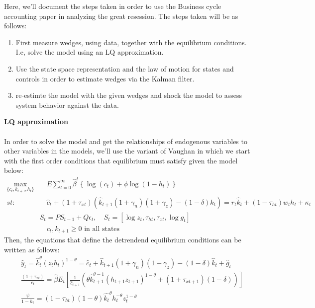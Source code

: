 \documentclass{article} %
\begin{document}
%
Here, we'll document the steps taken in order to use the Business cycle accounting paper in analyzing the great resession. The steps taken will be as follows:
\begin{enumerate}
\item First measure wedges, using data, together with the equilibrium conditions. I.e, solve the model using an LQ approximation.
\item Use the state space representation and the law of motion for states and controls in order to estimate wedges via the Kalman filter.
  \item re-estimte the model with the given wedges and shock the model to assess system behavior against the data. 
\end{enumerate}
\textbf{LQ approximation}
\\
\\
In order to solve the model and get the relationships of endogenous
variables to other variables in the models, we'll use the variant of
Vaughan in which we start with the first order conditions that
equilibrium must satisfy given the model below:
\begin{align*}
  \max_{\{c_t, k_{t+1}, h_t\}} & \quad  E\sum_{t=0}^{\infty} \hat{\beta}^t \left\{ \log(c_t) + \phi \log(1-h_t)     \right\}    \\
  st:     & \quad \hat{c}_t +  (1+\tau_{xt})(\hat{k}_{t+1}(1+\gamma_n)(1+\gamma_z) - (1-\delta)k_t) =r_t \hat{k}_t + (1-\tau_{ht}) w_t h_t + \kappa_t   \\
          & S_t = P S_{t-1} + Q \epsilon_t, \quad S_t = [\log z_t, \tau_{ht}, \tau_{xt}, \log g_t] \\
          & \quad c_t , k_{t+1} \geq 0 \text{ in all states}
\end{align*}
Then, the equations that define the detrendend equilibrium conditions can be written as
follows:
\begin{align} 
&\hat{y}_t = \hat{k}^{\theta}_t(z_t h_t)^{1-\theta} = \hat{c}_t + \hat{k}_{t+1}(1+\gamma_n)(1 + \gamma_z) - (1-\delta)\hat{k}_t + \hat{g}_t \label{eq:resource} \\
&\frac{(1+\tau_{xt})}{c_t} = \hat{\beta}E_t\left[\frac{1}{\hat{c}_{t+1}} \left(\theta \hat{k}_{t+1}^{\theta-1}(h_{t+1}z_{t+1})^{1-\theta} + (1+\tau_{xt+1})(1-\delta) \right) \right] \label{eq:euler} \\
& \frac{\psi}{1-h_t} = (1-\tau_{ht}) (1-\theta)\hat{k_t}^{\theta}h_t^{-\theta}z_t^{1-\theta}  \label{eq:mris}
\end{align}
\end{document}
